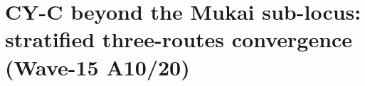
\providecommand{\ClaimStatusTheorem}{\textsc{[theorem]}}
\providecommand{\ClaimStatusConjectured}{\textsc{[conjectural]}}
\providecommand{\ClaimStatusConditional}[1]{\textsc{[conditional on: #1]}}
\providecommand{\ClaimStatusHeuristic}{\textsc{[heuristic]}}
\providecommand{\ClaimStatusDefinition}{\textsc{[definition]}}
\providecommand{\ClaimStatusProvedHere}{\textsc{[proved here]}}
\providecommand{\ClaimStatusOpen}{\textsc{[open]}}

\providecommand{\kch}{\kappa_{\mathrm{ch}}}
\providecommand{\kcat}{\kappa_{\mathrm{cat}}}
\providecommand{\kBKM}{\kappa_{\mathrm{BKM}}}
\providecommand{\kfib}{\kappa_{\mathrm{fiber}}}
\providecommand{\CoHA}{\mathrm{CoHA}}
\providecommand{\Coh}{\mathrm{Coh}}
\providecommand{\Hilb}{\mathrm{Hilb}}
\providecommand{\Rep}{\mathrm{Rep}}
\providecommand{\HH}{\mathrm{HH}}
\providecommand{\Stab}{\mathrm{Stab}}
\providecommand{\MO}{\mathrm{MO}}
\providecommand{\DT}{\mathrm{DT}}
\providecommand{\BPS}{\mathrm{BPS}}
\providecommand{\PT}{\mathrm{PT}}
\providecommand{\Ext}{\mathrm{Ext}}
\providecommand{\Sym}{\mathrm{Sym}}
\providecommand{\Ad}{\mathrm{Ad}}
\providecommand{\Eone}{E_{1}}
\providecommand{\Etwo}{E_{2}}
\providecommand{\LMuk}{\Lambda_{\mathrm{Muk}}}
\providecommand{\NS}{\mathrm{NS}}
\providecommand{\gfrak}{\mathfrak{g}}
\providecommand{\hfrak}{\mathfrak{h}}
\providecommand{\nfrak}{\mathfrak{n}}
\providecommand{\cA}{\mathcal{A}}
\providecommand{\cC}{\mathcal{C}}
\providecommand{\cL}{\mathcal{L}}
\providecommand{\cM}{\mathcal{M}}
\providecommand{\cR}{\mathcal{R}}
\providecommand{\cO}{\mathcal{O}}
\providecommand{\cD}{\mathcal{D}}
\providecommand{\bH}{\mathbf{H}}
\providecommand{\CC}{\mathbb{C}}
\providecommand{\QQ}{\mathbb{Q}}
\providecommand{\RR}{\mathbb{R}}
\providecommand{\ZZ}{\mathbb{Z}}
\providecommand{\PP}{\mathbb{P}}

\section{CY-C beyond the Mukai sub-locus: stratified three-routes
convergence (Wave-15 A10/20)}
\label{wn:sec:wave15-a10-CYC-generic-K3}

